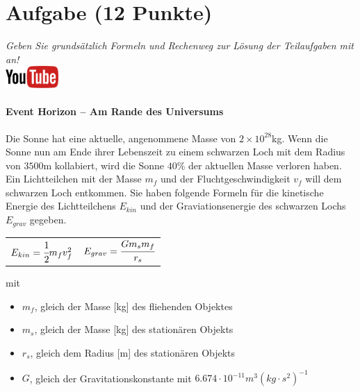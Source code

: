 \documentclass[a4paper, 10pt]{scrartcl}\usepackage[]{graphicx}\usepackage[]{xcolor}
\begin{document}
 
\clearpage

\section{Aufgabe \hfill (12 Punkte)}

\textit{Geben Sie grunds{\"a}tzlich Formeln und Rechenweg zur L{\"o}sung der
  Teilaufgaben mit an!} \\[1Ex]

\hfill\href{https://youtu.be/q-qYK4Chslg}{\includegraphics[width =
  2cm]{img/youtube}} %
\hspace{2Ex}

\paragraph{Event Horizon -- Am Rande des Universums}



Die Sonne hat eine aktuelle, angenommene Masse von $\ensuremath{2\times 10^{28}}$kg. Wenn
die Sonne nun am Ende ihrer Lebenszeit zu einem schwarzen Loch mit dem
Radius von $3500$m kollabiert, wird die Sonne $40$\%
der aktuellen Masse verloren haben. Ein Lichtteilchen mit der Masse $m_f$
und der Fluchtgeschwindigkeit $v_f$ will dem schwarzen Loch entkommen.  Sie
haben folgende Formeln f{\"u}r die kinetische Energie des Lichtteilchens
$E_{kin}$ und der Graviationsenergie des schwarzen Lochs $E_{grav}$
gegeben.

\begin{center}
  \begin{tabular}{cc}
    $E_{kin} = \cfrac{1}{2}m_fv_f^2$ & $E_{grav} = \cfrac{Gm_sm_f}{r_s}$\\
  \end{tabular}
\end{center}

mit

\begin{itemize}[noitemsep]
\item $m_f$, gleich der Masse [kg] des fliehenden Objektes
\item $m_s$, gleich der Masse [kg] des station{\"a}ren Objekts
\item $r_s$, gleich dem Radius [m] des station{\"a}ren Objekts  
\item $G$, gleich der Gravitationskonstante mit $6.674 \cdot 10^{-11}
  m^3(kg \cdot s^2)^{-1}$ 
\end{itemize}
\end{document}
